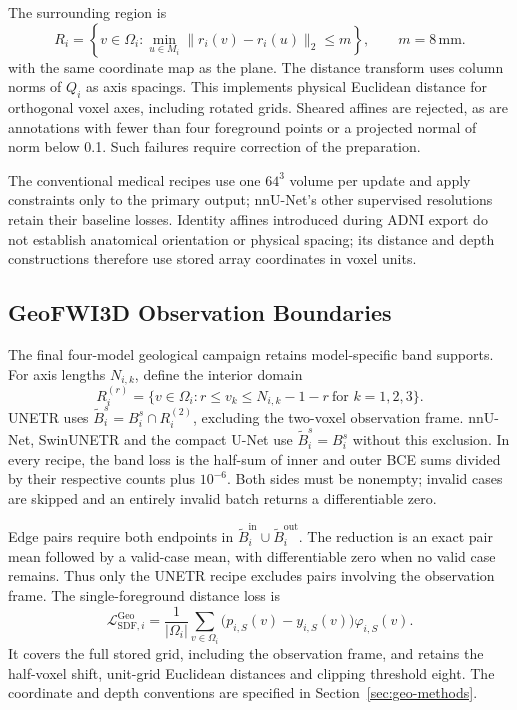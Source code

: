 \documentclass[12pt,a4paper]{article}
\begin{document}
The surrounding region is
\begin{equation}
R_i=\left\{v\in\Omega_i:
       \min_{u\in M_i}\|r_i(v)-r_i(u)\|_2\leq m\right\},
\qquad m=8\,\mathrm{mm}.
\label{eq:depth-region-of-interest}
\end{equation}
with the same coordinate map as the plane. The distance transform uses
column norms of $Q_i$ as axis spacings. This implements physical
Euclidean distance for orthogonal voxel axes, including rotated grids.
Sheared affines are rejected, as are annotations with fewer than four
foreground points or a projected normal of norm below 0.1. Such
failures require correction of the preparation.

The conventional medical recipes use one $64^3$ volume per update
and apply constraints only to the primary output; nnU-Net's other
supervised resolutions retain their baseline losses. Identity affines
introduced during ADNI export do not establish anatomical orientation
or physical spacing; its distance and depth constructions therefore
use stored array coordinates in voxel units.

\subsection{GeoFWI3D Observation Boundaries}
\label{sec:geo-boundaries}

The final four-model geological campaign retains model-specific band
supports. For axis lengths $N_{i,k}$, define the interior domain
\begin{equation}
R_i^{(r)}=\{v\in\Omega_i:
 r\leq v_k\leq N_{i,k}-1-r\ \text{for }k=1,2,3\}.
\label{eq:geological-band-frame}
\end{equation}
UNETR uses $\widetilde B_i^s=B_i^s\cap R_i^{(2)}$, excluding the
two-voxel observation frame. nnU-Net, SwinUNETR and the compact U-Net
use $\widetilde B_i^s=B_i^s$ without this exclusion. In every recipe,
the band loss is the half-sum of inner and outer BCE sums divided
by their respective counts plus $10^{-6}$. Both sides must be
nonempty; invalid cases are skipped and an entirely invalid batch
returns a differentiable zero.

Edge pairs require both endpoints in
$\widetilde B_i^{\mathrm{in}}\cup\widetilde B_i^{\mathrm{out}}$.
The reduction is an exact pair mean followed by a valid-case mean,
with differentiable zero when no valid case remains. Thus only the
UNETR recipe excludes pairs involving the observation frame.
The single-foreground distance loss is
\begin{equation}
\mathcal{L}_{\mathrm{SDF},i}^{\mathrm{Geo}}
=\frac{1}{|\Omega_i|}\sum_{v\in\Omega_i}
 \bigl(p_{i,S}(v)-y_{i,S}(v)\bigr)\varphi_{i,S}(v).
\label{eq:geological-sdf-loss}
\end{equation}
It covers the full stored grid, including the observation frame,
and retains the half-voxel shift, unit-grid Euclidean distances and
clipping threshold eight. The coordinate and depth conventions are
specified in Section~\ref{sec:geo-methods}.
\end{document}
